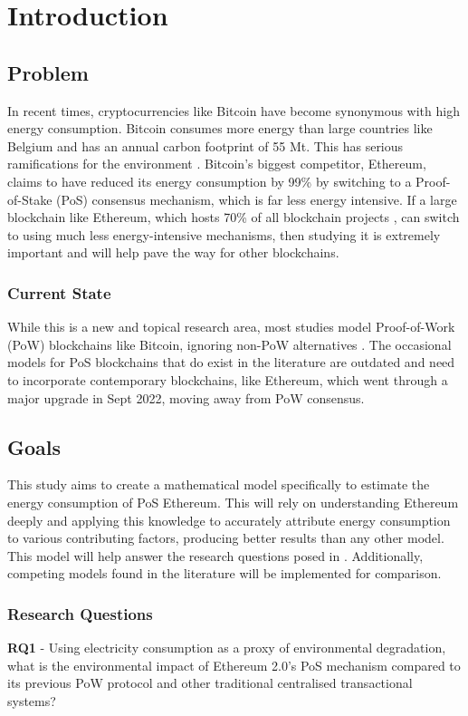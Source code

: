 \chapter{Introduction}

\section{Problem}
In recent times, cryptocurrencies like Bitcoin have become synonymous with high energy consumption. Bitcoin consumes more energy than large countries like Belgium and has an annual carbon footprint of 55 Mt. This has serious ramifications for the environment \cite{BitcoinDigiconomist}. Bitcoin's biggest competitor, Ethereum, claims to have reduced its energy consumption by 99\% by switching to a Proof-of-Stake (PoS) consensus mechanism, which is far less energy intensive. If a large blockchain like Ethereum, which hosts 70\% of all blockchain projects \cite{EthereumEthereum.org}, can switch to using much less energy-intensive mechanisms, then studying it is extremely important and will help pave the way for other blockchains. 

\subsection{Current State}
While this is a new and topical research area, most studies model Proof-of-Work (PoW) blockchains like Bitcoin, ignoring non-PoW alternatives \cite{Lei2021BestRecommendations}. The occasional models for PoS blockchains that do exist in the literature are outdated and need to incorporate contemporary blockchains, like Ethereum, which went through a major upgrade in Sept 2022, moving away from PoW consensus. 

\section{Goals}
This study aims to create a mathematical model specifically to estimate the energy consumption of PoS Ethereum. This will rely on understanding Ethereum deeply and applying this knowledge to accurately attribute energy consumption to various contributing factors, producing better results than any other model. This model will help answer the research questions posed in . Additionally, competing models found in the literature will be implemented for comparison.

\subsection{Research Questions}
\label{ResearchQuestions}
\textbf{RQ1} - Using electricity consumption as a proxy of environmental degradation, what is the environmental impact of Ethereum 2.0's PoS mechanism compared to its previous PoW protocol and other traditional centralised transactional systems?

